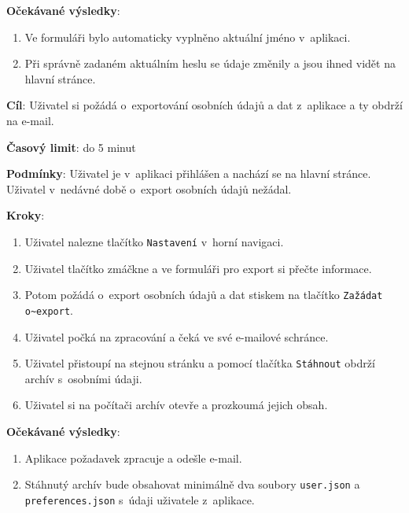 \textbf{Očekávané výsledky}:

\begin{enumerate}[leftmargin=1.4cm]
    \item Ve formuláři bylo automaticky vyplněno aktuální jméno v~aplikaci.
    \item Při správně zadaném aktuálním heslu se údaje změnily a jsou ihned vidět na hlavní stránce.
\end{enumerate}





\vspace{1em}

\textbf{Cíl}: Uživatel si požádá o~exportování osobních údajů a dat z~aplikace a ty obdrží na e-mail.

\textbf{Časový limit}: do 5 minut

\textbf{Podmínky}: Uživatel je v~aplikaci přihlášen a nachází se na hlavní stránce. Uživatel v~nedávné době o~export osobních údajů nežádal.

\textbf{Kroky}:

\begin{enumerate}[leftmargin=1.4cm]
    \item Uživatel nalezne tlačítko \verb|Nastavení| v~horní navigaci.
    \item Uživatel tlačítko zmáčkne a ve formuláři pro export si přečte informace.
    \item Potom požádá o~export osobních údajů a dat stiskem na tlačítko \verb|Zažádat o~export|.
    \item Uživatel počká na zpracování a čeká ve své e-mailové schránce.
    \item Uživatel přistoupí na stejnou stránku a pomocí tlačítka \verb|Stáhnout| obdrží archív s~osobními údaji.
    \item Uživatel si na počítači archív otevře a prozkoumá jejich obsah.
\end{enumerate}

\textbf{Očekávané výsledky}:

\begin{enumerate}[leftmargin=1.4cm]
    \item Aplikace požadavek zpracuje a odešle e-mail.
    \item Stáhnutý archív bude obsahovat minimálně dva soubory  \verb|user.json| a \verb|preferences.json| s~údaji uživatele z~aplikace.
\end{enumerate}

